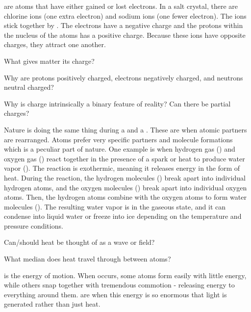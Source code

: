  are atoms that have either gained or lost electrons. In a salt crystal, there are chlorine ions (one extra electron) and sodium ions (one fewer electron). The ions stick together by . The electrons have a negative charge and the protons within the nucleus of the atoms has a positive charge. Because these ions have opposite charges, they attract one another.

\begin{questions}
	\item What gives matter its charge?
	\item Why are protons positively charged, electrons negatively charged, and neutrons neutral charged?
	\item Why is charge intrinsically a binary feature of reality? Can there be partial charges?
\end{questions}

Nature is doing the same thing during a  and a . These are when atomic partners are rearranged. Atoms prefer very specific partners and molecule formations which is a peculiar part of nature. One example is when hydrogen gas () and oxygen gas () react together in the presence of a spark or heat to produce water vapor (). The reaction is exothermic, meaning it releases energy in the form of heat. During the reaction, the hydrogen molecules () break apart into individual hydrogen atoms, and the oxygen molecules () break apart into individual oxygen atoms. Then, the hydrogen atoms combine with the oxygen atoms to form water molecules (). The resulting water vapor is in the gaseous state, and it can condense into liquid water or freeze into ice depending on the temperature and pressure conditions.

\begin{questions}
	\item Can/should heat be thought of as a wave or field?
	\item What median does heat travel through between atoms?
\end{questions}

 is the energy of motion. When  occurs, some atoms form easily with little energy, while others snap together with tremendous commotion - releasing energy to everything around them.  are when this energy is so enormous that light is generated rather than just heat.

